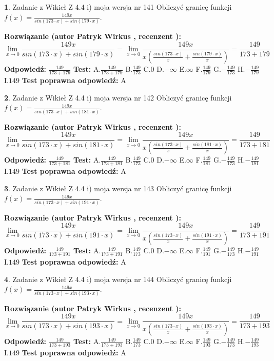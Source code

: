 \documentclass[12pt, a4paper]{article}
\theoremstyle{definition} %
\newtheorem{zad}{}
\newcommand{\zadStart}[1]{\begin{zad}#1\newline}
\newcommand{\zadStop}{\end{zad}}
\newcommand{\rozwStart}[2]{\noindent \textbf{Rozwiązanie (autor #1 , recenzent #2): }\newline}
\newcommand{\rozwStop}{\newline}
\newcommand{\odpStart}{\noindent \textbf{Odpowiedź:}\newline}
\newcommand{\odpStop}{\newline}
\newcommand{\testStart}{\noindent \textbf{Test:}\newline}
\newcommand{\testStop}{\newline}
\newcommand{\kluczStart}{\noindent \textbf{Test poprawna odpowiedź:}\newline}
\newcommand{\kluczStop}{\newline}
\begin{document}
\zadStart{Zadanie z Wikieł Z 4.4 i) moja wersja nr 141}
Obliczyć granicę funkcji $f(x)=\frac{149x}{sin(173\cdot x) +sin(179\cdot x)}$.
\zadStop
\rozwStart{Patryk Wirkus}{}
$$\lim\limits_{x\to 0}\frac{149x}{sin(173\cdot x) +sin(179\cdot x)}=\lim\limits_{x\to 0}\frac{149x}{x(\frac{sin(173\cdot x)}{x}+\frac{sin(179\cdot x)}{x})}=\frac{149}{173+179}$$
\rozwStop
\odpStart
$\frac{149}{173+179}$
\odpStop
\testStart
A.$\frac{149}{173+179}$
B.$\frac{149}{173}$
C.$0$
D.$-\infty$
E.$\infty$
F.$\frac{149}{179}$
G.$-\frac{149}{173}$
H.$-\frac{149}{179}$
I.$149$
\testStop
\kluczStart
A
\kluczStop



\zadStart{Zadanie z Wikieł Z 4.4 i) moja wersja nr 142}
Obliczyć granicę funkcji $f(x)=\frac{149x}{sin(173\cdot x) +sin(181\cdot x)}$.
\zadStop
\rozwStart{Patryk Wirkus}{}
$$\lim\limits_{x\to 0}\frac{149x}{sin(173\cdot x) +sin(181\cdot x)}=\lim\limits_{x\to 0}\frac{149x}{x(\frac{sin(173\cdot x)}{x}+\frac{sin(181\cdot x)}{x})}=\frac{149}{173+181}$$
\rozwStop
\odpStart
$\frac{149}{173+181}$
\odpStop
\testStart
A.$\frac{149}{173+181}$
B.$\frac{149}{173}$
C.$0$
D.$-\infty$
E.$\infty$
F.$\frac{149}{181}$
G.$-\frac{149}{173}$
H.$-\frac{149}{181}$
I.$149$
\testStop
\kluczStart
A
\kluczStop



\zadStart{Zadanie z Wikieł Z 4.4 i) moja wersja nr 143}
Obliczyć granicę funkcji $f(x)=\frac{149x}{sin(173\cdot x) +sin(191\cdot x)}$.
\zadStop
\rozwStart{Patryk Wirkus}{}
$$\lim\limits_{x\to 0}\frac{149x}{sin(173\cdot x) +sin(191\cdot x)}=\lim\limits_{x\to 0}\frac{149x}{x(\frac{sin(173\cdot x)}{x}+\frac{sin(191\cdot x)}{x})}=\frac{149}{173+191}$$
\rozwStop
\odpStart
$\frac{149}{173+191}$
\odpStop
\testStart
A.$\frac{149}{173+191}$
B.$\frac{149}{173}$
C.$0$
D.$-\infty$
E.$\infty$
F.$\frac{149}{191}$
G.$-\frac{149}{173}$
H.$-\frac{149}{191}$
I.$149$
\testStop
\kluczStart
A
\kluczStop



\zadStart{Zadanie z Wikieł Z 4.4 i) moja wersja nr 144}
Obliczyć granicę funkcji $f(x)=\frac{149x}{sin(173\cdot x) +sin(193\cdot x)}$.
\zadStop
\rozwStart{Patryk Wirkus}{}
$$\lim\limits_{x\to 0}\frac{149x}{sin(173\cdot x) +sin(193\cdot x)}=\lim\limits_{x\to 0}\frac{149x}{x(\frac{sin(173\cdot x)}{x}+\frac{sin(193\cdot x)}{x})}=\frac{149}{173+193}$$
\rozwStop
\odpStart
$\frac{149}{173+193}$
\odpStop
\testStart
A.$\frac{149}{173+193}$
B.$\frac{149}{173}$
C.$0$
D.$-\infty$
E.$\infty$
F.$\frac{149}{193}$
G.$-\frac{149}{173}$
H.$-\frac{149}{193}$
I.$149$
\testStop
\kluczStart
A
\kluczStop
\end{document}
